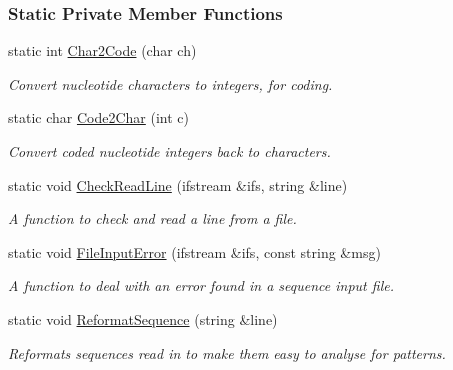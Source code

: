 \subsubsection*{\-Static \-Private \-Member \-Functions}
\begin{DoxyCompactItemize}
\item 
static int \hyperlink{classFPhyloPOT_a829e5b3cc0e80764cd3dac23c06cf06e}{\-Char2\-Code} (char ch)
\begin{DoxyCompactList}\small\item\em \-Convert nucleotide characters to integers, for coding. \end{DoxyCompactList}\item 
static char \hyperlink{classFPhyloPOT_a0926a4e893aeb2f2bd50b67ad97b7c3c}{\-Code2\-Char} (int c)
\begin{DoxyCompactList}\small\item\em \-Convert coded nucleotide integers back to characters. \end{DoxyCompactList}\item 
static void \hyperlink{classFPhyloPOT_a899c716603960c6abf8983f8392ef3d5}{\-Check\-Read\-Line} (ifstream \&ifs, string \&line)
\begin{DoxyCompactList}\small\item\em \-A function to check and read a line from a file. \end{DoxyCompactList}\item 
static void \hyperlink{classFPhyloPOT_a95285cf2a875065f9c80190fc5db9178}{\-File\-Input\-Error} (ifstream \&ifs, const string \&msg)
\begin{DoxyCompactList}\small\item\em \-A function to deal with an error found in a sequence input file. \end{DoxyCompactList}\item 
static void \hyperlink{classFPhyloPOT_aa8490107b21f3b7efe2fa3bbfc8c6b1c}{\-Reformat\-Sequence} (string \&line)
\begin{DoxyCompactList}\small\item\em \-Reformats sequences read in to make them easy to analyse for patterns. \end{DoxyCompactList}\end{DoxyCompactItemize}
